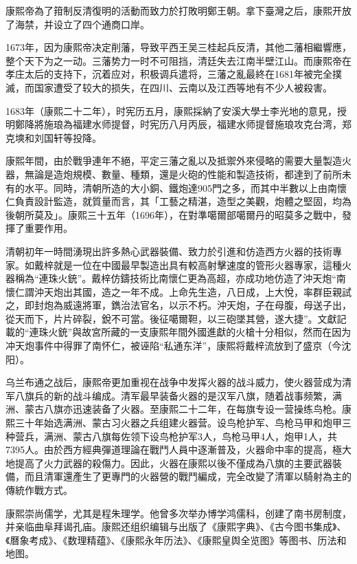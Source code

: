 康熙帝為了箝制反清復明的活動而致力於打敗明鄭王朝。拿下臺灣之后，康熙开放了海禁，并设立了四个通商口岸。

1673年，因为康熙帝决定削藩，导致平西王吴三桂起兵反清，其他二藩相繼響應，整个天下为之一动。三藩势力一时不可阻挡，清廷失去江南半壁江山。而康熙帝在孝庄太后的支持下，沉着应对，积极调兵遣将，三藩之亂最終在1681年被完全撲滅，而国家遭受了较大的损失，在四川、云南以及江西等地有不少人被殺害。

1683年（康熙二十二年），时宪历五月，康熙採納了安溪大學士李光地的意見，授明鄭降將施琅為福建水师提督，时宪历八月丙辰，福建水师提督施琅攻克台湾，郑克塽和刘国轩等投降。

康熙年間，由於戰爭連年不絕，平定三藩之亂以及抵禦外來侵略的需要大量製造火器，無論是造炮規模、數量、種類，還是火砲的性能和製造技術，都達到了前所未有的水平。同時，清朝所造的大小銅、鐵炮達905門之多，而其中半數以上由南懷仁負責設計監造，就質量而言，其「工藝之精湛，造型之美觀，炮體之堅固，均為後朝所莫及」。康熙三十五年（1696年），在對準噶爾部噶爾丹的昭莫多之戰中，發揮了重要作用。

清朝初年一時間湧現出許多熱心武器裝備、致力於引進和仿造西方火器的技術專家。如戴梓就是一位在中國最早製造出具有較高射擊速度的管形火器專家，這種火器稱為“連珠火銃”。戴梓仿鑄技術比南懷仁更為高超，亦成功地仿造了沖天炮“南懷仁謂沖天炮出其國，造之一年不成。上命先生造，八日成，上大悅，率群臣親試之，即封炮為威遠將軍，鐫治法官名，以示不朽。沖天炮，子在母腹，母送子出，從天而下，片片碎裂，銳不可當。後征噶爾靼，以三砲墜其營，遂大捷”。文獻記載的“連珠火銃”與故宮所藏的一支康熙年間外國進獻的火槍十分相似，然而在因为冲天炮事件中得罪了南怀仁，被诬陷“私通东洋”，康熙将戴梓流放到了盛京（今沈阳）。

乌兰布通之战后，康熙帝更加重视在战争中发挥火器的战斗威力，使火器营成为清军八旗兵的新的战斗编成。清军最早装备火器的是汉军八旗，随着战事频繁，满洲、蒙古八旗亦迅速装备了火器。至康熙二十二年，在每旗专设一营操练鸟枪。康熙三十年始选满洲、蒙古习火器之兵组建火器营。设鸟枪护军、鸟枪马甲和炮甲三种营兵，满洲、蒙古八旗每佐领下设鸟枪护军3人，鸟枪马甲4人，炮甲1人，共7395人。由於西方經典彈道理論在戰鬥人員中逐漸普及，火器命中率的提高，極大地提高了火力武器的殺傷力。因此，火器在康熙以後不僅成為八旗的主要武器裝備，而且清軍還產生了更專門的火器營的戰鬥編成，完全改變了清軍以騎射為主的傳統作戰方式。

康熙崇尚儒学，尤其是程朱理学。他曾多次举办博学鸿儒科，创建了南书房制度，并亲临曲阜拜谒孔庙。康熙还组织编辑与出版了《康熙字典》、《古今图书集成》、《曆象考成》、《数理精蕴》、《康熙永年历法》、《康熙皇舆全览图》等图书、历法和地图。

